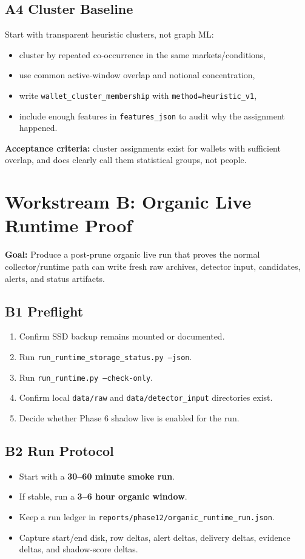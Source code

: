 \documentclass{article}
\begin{document}
\subsection*{A4 Cluster Baseline}
Start with transparent heuristic clusters, not graph ML:
\begin{itemize}[nosep]
\item cluster by repeated co-occurrence in the same markets/conditions,
\item use common active-window overlap and notional concentration,
\item write \texttt{wallet\_cluster\_membership} with \texttt{method=heuristic\_v1},
\item include enough features in \texttt{features\_json} to audit why the assignment happened.
\end{itemize}

\textbf{Acceptance criteria:} cluster assignments exist for wallets with sufficient overlap, and docs clearly call them statistical groups, not people.

\section*{Workstream B: Organic Live Runtime Proof}
\textbf{Goal:} Produce a post-prune organic live run that proves the normal collector/runtime path can write fresh raw archives, detector input, candidates, alerts, and status artifacts.

\subsection*{B1 Preflight}
\begin{enumerate}[nosep]
\item Confirm SSD backup remains mounted or documented.
\item Run \texttt{run\_runtime\_storage\_status.py --json}.
\item Run \texttt{run\_runtime.py --check-only}.
\item Confirm local \texttt{data/raw} and \texttt{data/detector\_input} directories exist.
\item Decide whether Phase 6 shadow live is enabled for the run.
\end{enumerate}

\subsection*{B2 Run Protocol}
\begin{itemize}[nosep]
\item Start with a \textbf{30--60 minute smoke run}.
\item If stable, run a \textbf{3--6 hour organic window}.
\item Keep a run ledger in \texttt{reports/phase12/organic\_runtime\_run.json}.
\item Capture start/end disk, row deltas, alert deltas, delivery deltas, evidence deltas, and shadow-score deltas.
\end{itemize}
\end{document}
